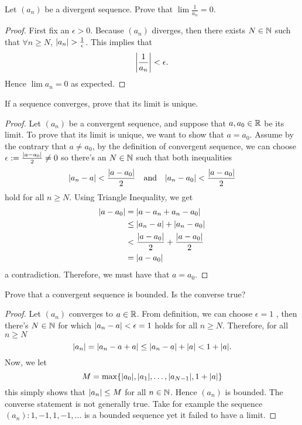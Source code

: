 \begin{exercise}
  Let $(a_n)$ be a divergent sequence. Prove that 
  $\lim\frac{1}{a_n}=0$.
\end{exercise}
\begin{proof}
  First fix an $\epsilon>0$. Because $(a_n)$ diverges,
  then there exists $N\in\N$ such that $\forall n\geq N$,
  $\abs{a_n}>\frac{1}{\epsilon}$. This implies that
  \[ \abs*{\frac{1}{a_n}}< \epsilon. \]
  Hence $\lim a_n=0$ as expected.
\end{proof}
\begin{exercise}
  If a sequence converges, prove that its limit is unique.
\end{exercise}
\begin{proof}
  Let $(a_n)$ be a convergent sequence, and suppose that $a,a_0\in\R$ 
  be its limit. To prove that its limit is unique, we want to show that 
  $a=a_0$. Assume by the contrary that $a\neq a_0$, by the definition 
  of convergent sequence, we can choose 
  $\epsilon:=\frac{\abs{a-a_0}}{2}\neq 0$
  so there's an $N\in\N$ such that both inequalities
  \[
    \abs{a_n-a}< \frac{\abs{a-a_0}}{2}
    \quad\text{and}\quad
    \abs{a_n-a_0}< \frac{\abs{a-a_0}}{2}
  \]
  hold for all $n\geq N$. Using Triangle Inequality, we get
  \begin{align*}
    \abs{a-a_0}
    &=\abs{a-a_n+a_n-a_0}\\
    &\leq \abs{a_n-a}+\abs{a_n-a_0}\\
    &< \frac{\abs{a-a_0}}{2}+\frac{\abs{a-a_0}}{2}\\
    &=\abs{a-a_0}
  \end{align*}
  a contradiction. Therefore, we must have that $a=a_0$.
\end{proof}
\begin{exercise}
  Prove that a convergent sequence is bounded. Is the converse true?
\end{exercise}
\begin{proof}
  Let  $(a_n)$ converges to $a\in\R$.
  From definition, we can choose $\epsilon=1$ , then
  there's $N\in\N$ for which $\abs{a_n-a}<\epsilon=1$ holds for 
  all $n\geq N$. Therefore, for all $n\geq N$
  \[
    \abs{a_n}=\abs{a_n-a+a}\leq\abs{a_n-a}+\abs{a}<1+\abs{a}.
  \]
  Now, we let
  \[
    M=\max\{
      \abs{a_0},\abs{a_1},\dots,\abs{a_{N-1}},
      1+\abs{a}
    \}
  \]
  this simply shows that $\abs{a_n}\leq M$ for all $n\in\N$.
  Hence $(a_n)$ is bounded.
  The converse statement is not generally true. Take for example the
  sequence $(a_n): 1,-1,1,-1,\dots $ is a bounded sequence yet 
  it failed to have a limit.
\end{proof}
